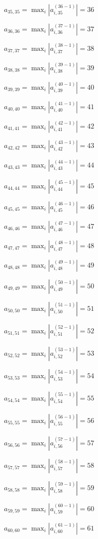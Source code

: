 \documentclass[a4paper,12pt]{article}
\begin{document}
$a _{ 35, 35 } =  \max _i |a _{ i, 35 } ^{ (36 - 1) } | = 36$

$a _{ 36, 36 } =  \max _i |a _{ i, 36 } ^{ (37 - 1) } | = 37$

$a _{ 37, 37 } =  \max _i |a _{ i, 37 } ^{ (38 - 1) } | = 38$

$a _{ 38, 38 } =  \max _i |a _{ i, 38 } ^{ (39 - 1) } | = 39$

$a _{ 39, 39 } =  \max _i |a _{ i, 39 } ^{ (40 - 1) } | = 40$

$a _{ 40, 40 } =  \max _i |a _{ i, 40 } ^{ (41 - 1) } | = 41$

$a _{ 41, 41 } =  \max _i |a _{ i, 41 } ^{ (42 - 1) } | = 42$

$a _{ 42, 42 } =  \max _i |a _{ i, 42 } ^{ (43 - 1) } | = 43$

$a _{ 43, 43 } =  \max _i |a _{ i, 43 } ^{ (44 - 1) } | = 44$

$a _{ 44, 44 } =  \max _i |a _{ i, 44 } ^{ (45 - 1) } | = 45$

$a _{ 45, 45 } =  \max _i |a _{ i, 45 } ^{ (46 - 1) } | = 46$

$a _{ 46, 46 } =  \max _i |a _{ i, 46 } ^{ (47 - 1) } | = 47$

$a _{ 47, 47 } =  \max _i |a _{ i, 47 } ^{ (48 - 1) } | = 48$

$a _{ 48, 48 } =  \max _i |a _{ i, 48 } ^{ (49 - 1) } | = 49$

$a _{ 49, 49 } =  \max _i |a _{ i, 49 } ^{ (50 - 1) } | = 50$

$a _{ 50, 50 } =  \max _i |a _{ i, 50 } ^{ (51 - 1) } | = 51$

$a _{ 51, 51 } =  \max _i |a _{ i, 51 } ^{ (52 - 1) } | = 52$

$a _{ 52, 52 } =  \max _i |a _{ i, 52 } ^{ (53 - 1) } | = 53$

$a _{ 53, 53 } =  \max _i |a _{ i, 53 } ^{ (54 - 1) } | = 54$

$a _{ 54, 54 } =  \max _i |a _{ i, 54 } ^{ (55 - 1) } | = 55$

$a _{ 55, 55 } =  \max _i |a _{ i, 55 } ^{ (56 - 1) } | = 56$

$a _{ 56, 56 } =  \max _i |a _{ i, 56 } ^{ (57 - 1) } | = 57$

$a _{ 57, 57 } =  \max _i |a _{ i, 57 } ^{ (58 - 1) } | = 58$

$a _{ 58, 58 } =  \max _i |a _{ i, 58 } ^{ (59 - 1) } | = 59$

$a _{ 59, 59 } =  \max _i |a _{ i, 59 } ^{ (60 - 1) } | = 60$

$a _{ 60, 60 } =  \max _i |a _{ i, 60 } ^{ (61 - 1) } | = 61$
\end{document}
